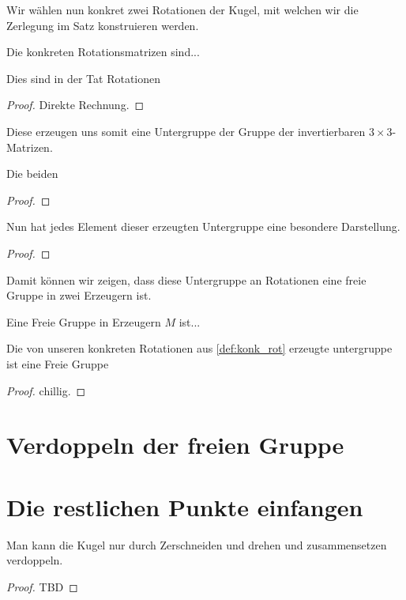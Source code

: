 Wir wählen nun konkret zwei Rotationen der Kugel, mit welchen wir die Zerlegung im Satz konstruieren werden.
\begin{definition}\label{def:konk_rot}
\leanok
Die konkreten Rotationsmatrizen sind... 
\end{definition}
\begin{lemma}\label{lem:konk_rot_sind_rot}
Dies sind in der Tat Rotationen
\end{lemma}
\begin{proof}
Direkte Rechnung.
\end{proof}

Diese erzeugen uns somit eine Untergruppe der Gruppe der invertierbaren $3\times3$-Matrizen.
\begin{lemma}\label{lem:konk_rot_erzeugt}
Die beiden
\end{lemma}
\begin{proof}

\end{proof}

Nun hat jedes Element dieser erzeugten Untergruppe eine besondere Darstellung.
\begin{lemma}\label{lem:darst_von_rot}
\end{lemma}
\begin{proof}

\end{proof}
Damit können wir zeigen, dass diese Untergruppe an Rotationen eine freie Gruppe in zwei Erzeugern ist.

\begin{definition}\label{def:freie_grp}
Eine Freie Gruppe in Erzeugern $M$ ist...
\end{definition}

\begin{theorem}\label{thm:freie_grp_an_rot}
Die von unseren konkreten Rotationen aus \ref{def:konk_rot} erzeugte untergruppe ist eine Freie Gruppe
\end{theorem}
\begin{proof}
chillig.
\end{proof}
\section{Verdoppeln der freien Gruppe}
\section{Die restlichen Punkte einfangen}
\begin{theorem}\label{thm:BanachTarski}
Man kann die Kugel nur durch Zerschneiden und drehen und zusammensetzen verdoppeln.
\end{theorem}
\begin{proof}
TBD
\end{proof}
